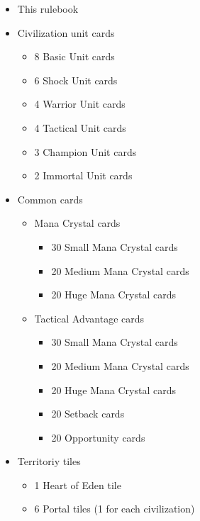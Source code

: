 \documentclass[a4paper]{article}
\begin{document}
    \begin{itemize}
        \item This rulebook
        \item Civilization unit cards
            \begin{itemize}
                \item 8 Basic Unit cards
                \item 6 Shock Unit cards
                \item 4 Warrior Unit cards
                \item 4 Tactical Unit cards
                \item 3 Champion Unit cards
                \item 2 Immortal Unit cards
            \end{itemize}
        \item Common cards
            \begin{itemize}
                \item Mana Crystal cards
                    \begin{itemize}
                        \item 30 Small Mana Crystal cards
                        \item 20 Medium Mana Crystal cards
                        \item 20 Huge Mana Crystal cards
                    \end{itemize}
                \item Tactical Advantage cards
                    \begin{itemize}
                        \item 30 Small Mana Crystal cards
                        \item 20 Medium Mana Crystal cards
                        \item 20 Huge Mana Crystal cards
                        \item 20 Setback cards
                        \item 20 Opportunity cards
                    \end{itemize}
            \end{itemize}
\newpage
        \item Territoriy tiles
            \begin{itemize}
                \item 1 Heart of Eden tile
                \item 6 Portal tiles (1 for each civilization)

\end{itemize}
\end{itemize}
\end{document}
